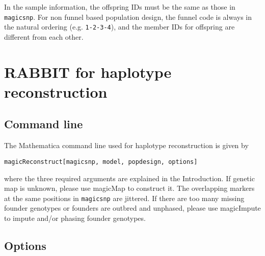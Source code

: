 \documentclass[12pt]{article}
\begin{document}
In the sample information, the offspring IDs must be the same as those in \verb|magicsnp|. For non funnel based population design, the funnel code is always in the natural ordering (e.g. \verb|1-2-3-4|), and the member IDs for offspring are different from each other. 

\section{RABBIT for haplotype reconstruction}

\subsection{Command line}

The Mathematica command line used for haplotype reconstruction is given by
\begin{verbatim}
magicReconstruct[magicsnp, model, popdesign, options]
\end{verbatim}
where the three required arguments are explained in the Introduction. If genetic map is unknown, please use magicMap to construct it. The overlapping markers at the same positions in \verb|magicsnp| are jittered.  If there are too many missing founder genotypes or founders are outbred and unphased, please use magicImpute to impute and/or phasing founder genotypes. 

\subsection{Options}
\end{document}
